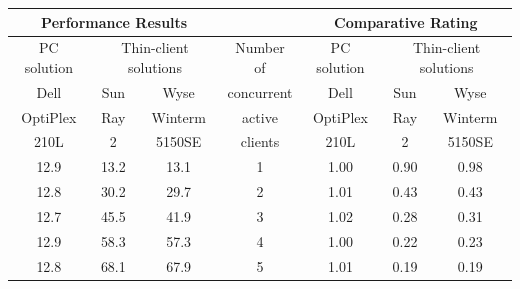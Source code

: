                 \begin{table}
                    \centering
                    \begin{tabular}{|c|c|c|c|c|c|c|}
                    \hline
                    \multicolumn{ 3}{|c|}{Performance Results} &            & \multicolumn{ 3}{|c|}{Comparative Rating} \\
                    \hline
                    PC solution & \multicolumn{ 2}{|c|}{Thin-client solutions} & Number of   & PC solution & \multicolumn{ 2}{|c|}{Thin-client solutions} \\
                    \hline
                          Dell &        Sun &       Wyse & concurrent &       Dell &        Sun &       Wyse \\

                      OptiPlex &        Ray &    Winterm &     active &   OptiPlex &        Ray &    Winterm \\

                          210L &          2 &     5150SE &    clients &       210L &          2 &     5150SE \\
                    \hline
                          12.9 &       13.2 &       13.1 &          1 &       1.00 &       0.90 &       0.98 \\
                    \hline
                          12.8 &       30.2 &       29.7 &          2 &       1.01 &       0.43 &       0.43 \\
                    \hline
                          12.7 &       45.5 &       41.9 &          3 &       1.02 &       0.28 &       0.31 \\
                    \hline
                          12.9 &       58.3 &       57.3 &          4 &       1.00 &       0.22 &       0.23 \\
                    \hline
                          12.8 &       68.1 &       67.9 &          5 &       1.01 &       0.19 &       0.19 \\
                    \hline
                    \end{tabular}  
                    \label{tab:table_excel_test}
                \end{table}
